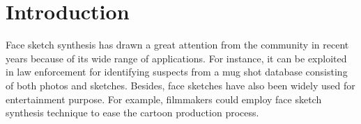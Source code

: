 \documentclass[10pt,twocolumn,letterpaper]{article}
\begin{document}
\section{Introduction}

Face sketch synthesis has drawn a great attention from the community in recent years because of its wide range of applications. For instance, it can be exploited in law enforcement for identifying suspects from a mug shot database consisting of both photos and sketches. Besides, face sketches have also been widely used for entertainment purpose. For example, filmmakers could employ face sketch synthesis technique to ease the cartoon production process.

\begin{figure}[t]
\centering
{}

\end{figure}
\end{document}

